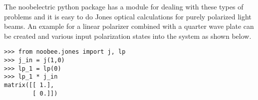 The noobelectric python package has a module for dealing with these types of problems and it is easy to do Jones optical calculations for purely polarized light beams.  An example for a linear polarizer combined with a quarter wave plate can be created and various input polarization states into the system as shown below.
\begin{lstlisting}
>>> from noobee.jones import j, lp
>>> j_in = j(1,0)
>>> lp_1 = lp(0)
>>> lp_1 * j_in
matrix([[ 1.],
        [ 0.]])
\end{lstlisting}
